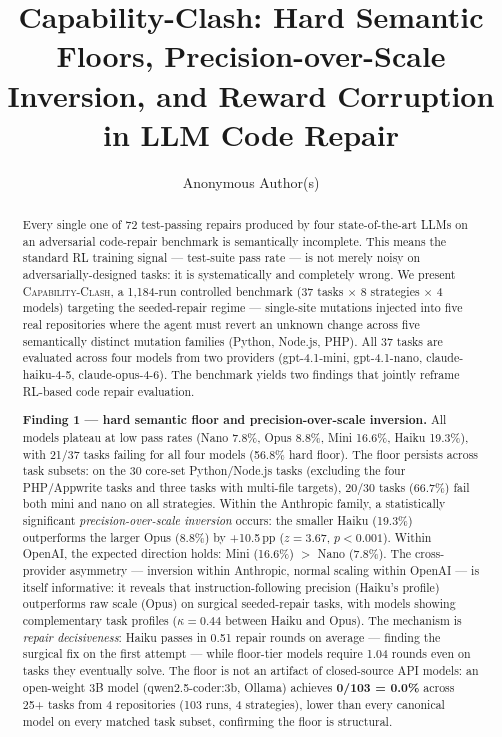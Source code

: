 \documentclass[sigconf,review,anonymous]{acmart}
\newcommand{\ccbench}{\textsc{Capability-Clash}}
\newcommand{\pp}{\,pp}
\begin{document}
\title[Capability-Clash]{Capability-Clash: Hard Semantic Floors, Precision-over-Scale Inversion, and Reward Corruption in LLM Code Repair}

\author{Anonymous Author(s)}

\begin{abstract}
Every single one of 72 test-passing repairs produced by four state-of-the-art LLMs on an adversarial code-repair benchmark is semantically incomplete. This means the standard RL training signal — test-suite pass rate — is not merely noisy on adversarially-designed tasks: it is systematically and completely wrong. We present \ccbench{}, a 1{,}184-run controlled benchmark (37 tasks $\times$ 8 strategies $\times$ 4 models) targeting the seeded-repair regime — single-site mutations injected into five real repositories where the agent must revert an unknown change across five semantically distinct mutation families (Python, Node.js, PHP). All 37 tasks are evaluated across four models from two providers (gpt-4.1-mini, gpt-4.1-nano, claude-haiku-4-5, claude-opus-4-6). The benchmark yields two findings that jointly reframe RL-based code repair evaluation.

\textbf{Finding 1 — hard semantic floor and precision-over-scale inversion.}
All models plateau at low pass rates (Nano 7.8\%, Opus 8.8\%, Mini 16.6\%, Haiku 19.3\%), with 21/37 tasks failing for all four models (56.8\% hard floor). The floor persists across task subsets: on the 30 core-set Python/Node.js tasks (excluding the four PHP/Appwrite tasks and three tasks with multi-file targets), 20/30 tasks (66.7\%) fail both mini and nano on all strategies. Within the Anthropic family, a statistically significant \emph{precision-over-scale inversion} occurs: the smaller Haiku (19.3\%) outperforms the larger Opus (8.8\%) by +10.5\pp{} ($z=3.67$, $p<0.001$). Within OpenAI, the expected direction holds: Mini (16.6\%) $>$ Nano (7.8\%). The cross-provider asymmetry — inversion within Anthropic, normal scaling within OpenAI — is itself informative: it reveals that instruction-following precision (Haiku's profile) outperforms raw scale (Opus) on surgical seeded-repair tasks, with models showing complementary task profiles ($\kappa = 0.44$ between Haiku and Opus). The mechanism is \emph{repair decisiveness}: Haiku passes in 0.51 repair rounds on average — finding the surgical fix on the first attempt — while floor-tier models require 1.04 rounds even on tasks they eventually solve. The floor is not an artifact of closed-source API models: an open-weight 3B model (qwen2.5-coder:3b, Ollama) achieves \textbf{0/103 = 0.0\%} across 25+ tasks from 4 repositories (103 runs, 4 strategies), lower than every canonical model on every matched task subset, confirming the floor is structural.


\end{abstract}
\end{document}
